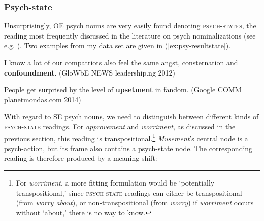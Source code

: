 \begin{exe}
	\ex \label{ex:psy-worriment}
	\begin{xlist}
	\end{xlist}
\end{exe}

\subsubsection{Psych-state}
\label{sec:psy-output-survey-resultstate}

Unsurprisingly, OE psych nouns are very easily found denoting \textsc{psych-states}, the reading most frequently discussed in the literature on psych nominalizations (see e.g. \citealt{Pesetsky.1995}). Two examples from my data set are given in (\ref{ex:psy-resultstate}). 

\begin{exe}
	\ex \label{ex:psy-resultstate}
	\begin{xlist}
		\item \label{ex:psy-resultstate1} I know a lot of our compatriots also feel the same angst, consternation and \textbf{confoundment}. {\small(\acs{GloWbE} NEWS leadership.ng 2012)} 
		\item \label{ex:psy-resultstate2}  People get surprised by the level of \textbf{upsetment} in fandom. 
		{\small(Google COMM planetmondas.com 2014)} 
	\end{xlist}
\end{exe}

\noindent With regard to SE psych nouns, we need to distinguish between different kinds of \textsc{psych-state} readings. For \textit{approvement} and \textit{worriment}, as discussed in the previous section, this reading is transpositional.\footnote{For \textit{worriment}, a more fitting formulation would be `potentially transpositional,' since \textsc{psych-state} readings can either be transpositional (from \textit{worry about}), or non-transpositional (from \textit{worry}) \textendash{} if \textit{worriment} occurs without `about,' there is no way to know.} \textit{Musement}'s central node is a psych-action, but its frame also contains a psych-state node. The corresponding reading is therefore produced by a meaning shift:

